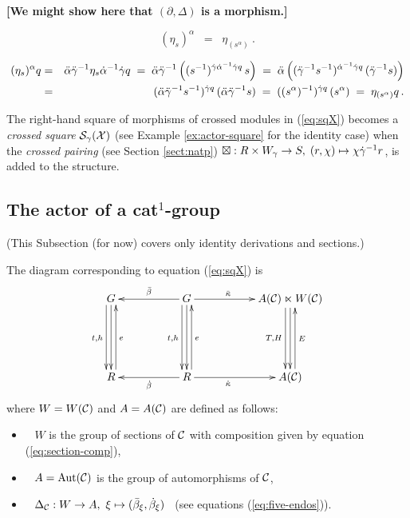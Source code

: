 \vspace{3mm}
\noindent
{\bf [We might show here that $(\partial,\Delta)$ is a morphism.]}
\vspace{3mm}

\begin{lem}
$$
(\eta_s)^{\alpha} \;\;=\;\; \eta_{(s^{\alpha})}~.
$$
\end{lem}
\begin{pf} 
\begin{eqnarray*}
(\eta_s)^{\alpha}q 
  & = &  \ddot{\alpha} \ddot{\gamma}^{-1} \eta_s \dot{\alpha}^{-1} \dot{\gamma} q  
  \;=\;  \ddot{\alpha} \ddot{\gamma}^{-1} 
           \left( (s^{-1})^{\dot{\gamma}\dot{\alpha}^{-1}\dot{\gamma} q}\,s \right) 
  \;=\;  \ddot{\alpha}\left( (\ddot{\gamma}^{-1}s^{-1})^{\dot{\alpha}^{-1}\dot{\gamma} q}\,(\ddot{\gamma}^{-1}s)\right) \\ 
  & = &  (\ddot{\alpha} \ddot{\gamma}^{-1} s^{-1})^{\dot{\gamma} q}\,(\ddot{\alpha} \ddot{\gamma}^{-1}s)  
  \;=\;  ((s^{\alpha})^{-1})^{\dot{\gamma} q}\,(s^{\alpha}) 
  \;=\;  \eta_{(s^{\alpha})}q \,. 
\end{eqnarray*}
\end{pf}

\bigskip 
The right-hand square of morphisms of crossed modules in (\ref{eq:sqX})
becomes a \emph{crossed square} $\mathcal{S}_{\gamma}(\mathcal{X})$ 
(see Example \ref{ex:actor-square} for the identity case) 
when the \emph{crossed pairing} (see Section \ref{sect:natp}) 
$\boxtimes : R \times W_{\gamma} \to S,\; (r,\chi) \mapsto \chi \dot{\gamma}^{-1} r$, 
is added to the structure. 



\subsection{The actor of a cat$^1$-group} \label{subs:AC}

(This Subsection (for now) covers only identity derivations and sections.) 

\medskip\noindent
The diagram corresponding to equation (\ref{eq:sqX}) is
\begin{equation} \label{eq:sqC}
\vcenter{\xymatrix{
  G \ar[dd]  \ar[dd] <-1.0ex>_{t,h}
    &&  G \ar[ll]_{\barb}  \ar[rr]^(0.4){\ddk}
          \ar[dd]  \ar[dd] <-1.0ex>_{t,h}
       &&  A(\calC) \ltimes W(\calC)  
            \ar[dd]  \ar[dd] <-1.0ex>_{T,H}  \\
    && &&   \\
  R \ar[uu] <-1.0ex>_e 
    &&  R \ar[uu] <-1.0ex>_e \ar[ll]^{\db} \ar[rr]_(0.4){\dk}
       &&  A(\calC) \ar[uu] <-1.0ex>_{E} \\
}} 
\end{equation}
where $W = W(\mathcal{C})$ and $A = A(\mathcal{C})$ are defined as follows:
\begin{itemize}
\item~
$W$ is the group of sections of $\mathcal{C}$
with composition given by equation (\ref{eq:section-comp}),
\item~
$A=\mathrm{Aut}(\mathcal{C})$ is the group of automorphisms of $\mathcal{C}$,
\item~
$\Delta_{\mathcal{C}} : W \to A,~
\xi \mapsto (\bar{\beta}_{\xi}, \dot{\beta}_{\xi})$~
(see equations (\ref{eq:five-endos})).
\end{itemize}

